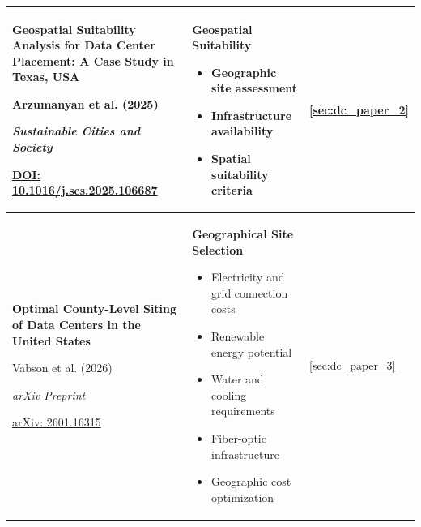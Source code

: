 \begin{longtable}{
    |p{7.0cm}|p{5.8cm}|p{2.2cm}|
}
\rowcolor{green!8}
\textbf{Geospatial Suitability Analysis for Data
Center Placement: A Case Study in Texas, USA}

Arzumanyan et al. (2025)

\textit{Sustainable Cities and Society}

\href{https://doi.org/10.1016/j.scs.2025.106687}
{DOI: 10.1016/j.scs.2025.106687}
&
\textbf{Geospatial Suitability}
\begin{itemize}
    \setlength{\itemsep}{0pt}
    \setlength{\topsep}{0pt}
    \item Geographic site assessment
    \item Infrastructure availability
    \item Spatial suitability criteria
\end{itemize}
&
{\centering\hyperref[sec:dc_paper_2]{\ref*{sec:dc_paper_2}}}
\\ \hline


\textbf{Optimal County-Level Siting of Data Centers
in the United States}

Vabson et al. (2026)

\textit{arXiv Preprint}

\href{https://arxiv.org/abs/2601.16315}
{arXiv: 2601.16315}
&
\textbf{Geographical Site Selection}
\begin{itemize}
    \setlength{\itemsep}{0pt}
    \setlength{\topsep}{0pt}
    \item Electricity and grid connection costs
    \item Renewable energy potential
    \item Water and cooling requirements
    \item Fiber-optic infrastructure
    \item Geographic cost optimization
\end{itemize}
&
{\centering\hyperref[sec:dc_paper_3]{\ref*{sec:dc_paper_3}}}
\\ \hline


\end{longtable}

\normalsize

\vspace{0.3cm}



